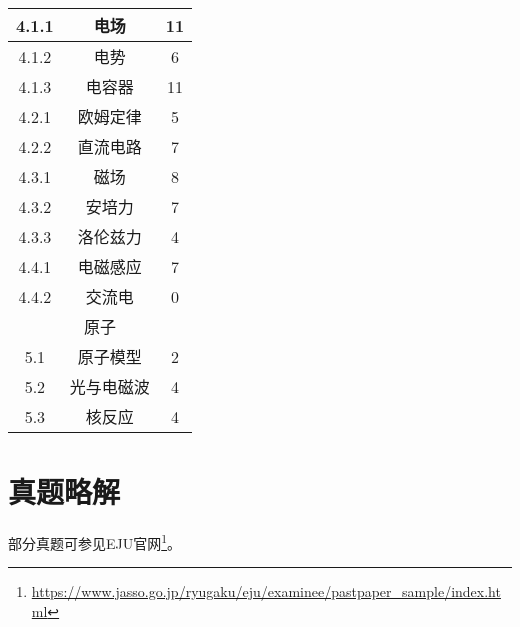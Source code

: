 \begin{center}
\begin{minipage}{0.48\textwidth}
\begin{tabular}{c|c|c}
            4.1.1&电场&11\\\hline
            4.1.2&电势&6\\\hline
            4.1.3&电容器&11\\\hline
            4.2.1&欧姆定律&5\\\hline
            4.2.2&直流电路&7\\\hline
            4.3.1&磁场&8\\\hline
            4.3.2&安培力&7\\\hline
            4.3.3&洛伦兹力&4\\\hline
            4.4.1&电磁感应&7\\\hline
            4.4.2&交流电&0\\\hline
            \multicolumn{3}{c}{原子}\\\hline
            5.1&原子模型&2\\\hline
            5.2&光与电磁波&4\\\hline
            5.3&核反应&4\\\hline
        \end{tabular}
    \end{minipage}
\end{center}

\chapter{真题略解}

部分真题可参见EJU官网\footnote{\url{https://www.jasso.go.jp/ryugaku/eju/examinee/pastpaper_sample/index.html}}。










